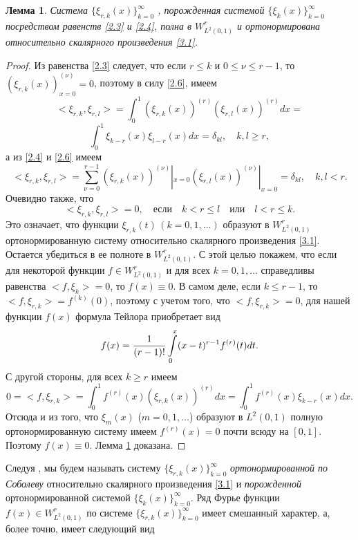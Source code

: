 \documentclass{article}
\numberwithin{equation}{section}
\theoremstyle{plain}
\newtheorem{lemma}{Лемма}[section]
\theoremstyle{definition}
\newtheorem{proof}{Доказательство}\def\theproof{}
\begin{document}
\begin{fulltext}
 \begin{lemma}\label{lem3.1} Система $\{\xi_{r,k}(x)\}_{k=0}^\infty$ , порожденная системой $\{\xi_{k}(x)\}_{k=0}^\infty$ посредством равенств \eqref{2.3} и \eqref{2.4}, полна  в $W^r_{L^2(0,1)}$ и ортонормирована относительно скалярного произведения \eqref{3.1}.
 \end{lemma}
\begin{proof}
Из равенства \eqref{2.3} следует, что если $r\le k$ и $0\le\nu\le r-1$, то  $(\xi_{r,k}(x))^{(\nu)}_{x=0}=0$, поэтому
в силу \eqref{2.6},  имеем
$$
<\xi_{r,k},\xi_{r,l}>= \int_{0}^1(\xi_{r,k}(x))^{(r)}(\xi_{r,l}(x))^{(r)} dx=
$$
\begin{equation}\label{3.2}
    \int_{0}^1\xi_{k-r}(x)\xi_{l-r}(x) dx=\delta_{kl},\quad k,l\ge r ,
  \end{equation}
  а из \eqref{2.4} и \eqref{2.6} имеем
\begin{equation}\label{3.3}
  <\xi_{r,k},\xi_{r,l}>=
  \sum_{\nu=0}^{r-1}(\xi_{r,k}(x))^{(\nu)}|_{x=0}(\xi_{r,l}(x))^{(\nu)}|_{x=0}=\delta_{kl},\quad k,l< r.
  \end{equation}
  Очевидно также, что
  \begin{equation}\label{3.4}
  <\xi_{r,k},\xi_{r,l}>=0,\quad \text{если}\quad k< r\le l\quad \text{или} \quad l< r\le k.
  \end{equation}
 Это означает, что функции  $\xi_{r,k}(t)\, (k=0,1,\ldots) $ образуют   в $W^r_{L^2(0,1)}$ ортонормированную  систему относительно скалярного произведения \eqref{3.1}.  Остается убедиться в ее полноте в $W^r_{L^2(0,1)}$. С этой целью покажем, что если для некоторой функции $f\in W^r_{L^2(0,1)}$ и для  всех $k=0,1,\ldots$ справедливы равенства $<f,\xi_k>=0$, то $f(x)\equiv0$. В самом деле, если $k\le r-1$, то  $<f,\xi_{r,k}>=f^{(k)}(0)$, поэтому с учетом того, что $<f,\xi_{r,k}>=0$,  для нашей функции  $f(x)$ формула Тейлора приобретает вид
\begin{equation}\label{3.5}
f(x)={1\over (r-1)!}\int\limits_{0}^x(x-t)^{r-1} f^{(r)}(t)dt.
     \end{equation}
С другой стороны, для всех $k\ge r$ имеем
$$
 0= <f,\xi_{r,k}>=\int_{0}^1f^{(r)}(x) (\xi_{r,k}(x))^{(r)}dx=
  \int_{0}^1 f^{(r)}(x)\xi_{k-r}(x) dx .
$$
Отсюда и из того, что $\xi_m(x)$ ($m=0,1,\ldots$)  образуют в $L^2(0,1)$ полную ортонормированную систему имеем $f^{(r)}(x)=0$ почти всюду на $[0,1]$. Поэтому   $f(x)\equiv0$. Лемма \ref{lem3.1} доказана.
\end{proof}
   Следуя \cite{SharIzv2018}, мы будем называть систему $\{\xi_{r,k}(x)\}_{k=0}^\infty$ {\it ортонормированной по Соболеву } относительно скалярного произведения \eqref{3.1} и  {\it порожденной} ортонормированной системой $\{\xi_{k}(x)\}_{k=0}^\infty$. Ряд Фурье функции $f(x)\in W^r_{L^2(0,1)}$ по системе  $\{\xi_{r,k}(x)\}_{k=0}^\infty$ имеет смешанный характер, а, более точно, имеет следующий вид

\end{fulltext}
\end{document}
